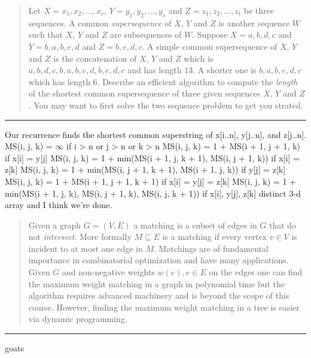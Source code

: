 \documentclass[11pt]{article}
\begin{document}

\begin{quote}
Let $X = x_1,x_2,\ldots,x_r$, $Y = y_1,y_2,\ldots,y_s$ and $Z =
  z_1,z_2,\ldots,z_t$ be three sequences. A common {\em supersequence}
  of $X$, $Y$ and $Z$ is another sequence $W$ such that $X$, $Y$ and $Z$
  are subsequences of $W$. Suppose $X = a,b,d,c$ and $Y = b,a,b,e,d$ and $Z =
  b, e, d, c$. A simple common supersequence of $X$, $Y$ and $Z$ is
  the concatenation of $X$, $Y$ and $Z$ which is
  $a,b,d,c,b,a,b,e,d,b,e,d,c$ and has length $13$. A shorter one is
  $b, a, b, e, d, c$ which has length $6$.  Describe an efficient
  algorithm to compute the {\em length} of the shortest common
  supersequence of three given sequences $X$, $Y$ and $Z$. You may want to
  first solve the two sequence problem to get you strated.
\end{quote}
\hrule



\begin{solution}
    Our recurrence finds the shortest common superstring of x[i..n], y[j..n], and z[j..n]. 
    MS(i, j, k) = $\infty$ if i > n or j > n or k > n
    MS(i, j, k) = 1 + MS(i + 1, j + 1, k) if x[i] = y[j]
    MS(i, j, k) = 1 + min(MS(i + 1, j, k + 1), MS(i, j + 1, k)) if x[i] = z[k]
    MS(i, j, k) = 1 + min(MS(i, j + 1, k + 1), MS(i + 1, j, k)) if y[j] = z[k]
    MS(i, j, k) = 1 + MS(i + 1, j + 1, k + 1) if x[i] = y[j] = z[k]
    MS(i, j, k) = 1 + min(MS(i + 1, j, k), MS(i, j + 1, k), MS(i, j, k + 1)) if x[i], y[j], z[k] distinct
    3-d array and I think we're done.
\end{solution}


\begin{quote}
Given a graph $G=(V,E)$ a matching is a subset of edges in $G$
  that do not \emph{intersect}. More formally $M \subseteq E$ is a
  matching if every vertex $v \in V$ is incident to at most one edge
  in $M$. Matchings are of fundamental importance in combinatorial
  optimization and have many applications. Given $G$ and non-negative
  weights $w(e), e \in E$ on the edges one can find the maximum weight
  matching in a graph in polynomial time but the algorithm requires
  advanced machinery and is beyond the scope of this course. However,
  finding the maximum weight matching in a tree is easier via dynamic
  programming. 
\end{quote}
\hrule



\begin{solution}
    goats
\end{solution}
\end{document}
